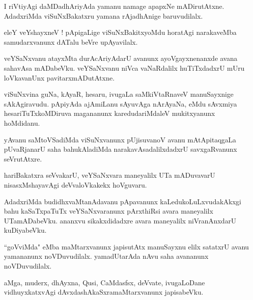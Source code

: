 \documentclass{article}
\begin{document}
\begin{mn}
I riVtiyAgi daMDadhAriyAda yamanu namage apapxNe mADirutAtxne. AdadxriMda viSuNxBakatxru yamana 
rAjadhAnige baruvudilalx.
\end{mn}

\begin{mn}
eleY veYshayxneV ! pApigaLige viSuNxBakitxyoMdu horatAgi narakaveMba samudarxvanunx dATalu beVre 
upAyavilalx.
\end{mn}

\begin{mn}
veYSaNxvanu atayxMta durAcAriyAdarU avanunx ayoVgayxnenanxde avana sahavAsa mADabeVku. 
veYSaNxvanu niVca vaNaRdalilx huTiTxdadxrU mUru loVkavanUnx pavitarxmADutAtxne.
\end{mn}

\begin{mn}
viSuNxvina guNa, kAyaR, hesaru, ivugaLa saMkiVtaRnaveV manuSayxnige sAkAgiravudu. pApiyAda 
ajAmiLanu sAyuvAga nArAyaNa, eMdu sAvxmiya hesariTuTxkoMDiruva magananunx karedudariMdaleV 
mukitxyanunx hoMdidanu.
\end{mn}

\begin{mn}
yAvanu saMtoVSadiMda viSuNxvanunx pUjisuvanoV avanu mAtApitaqgaLa pUvaRjanarU saha bahukAladiMda 
narakavAsadalilxdadxrU savxgaRvanunx seVrutAtxre.
\end{mn}

\begin{mn}
hariBakatxra seVvakarU, veYSaNxvara maneyalilx UTa mADuvavarU nisasxMshayavAgi deVvaloVkakekx 
hoVguvaru.
\end{mn}

\begin{mn}
AdadxriMda budidhxvaMtanAdavanu pApavanunx kaLedukoLuLxvudakAkxgi bahu kaSaTxpaTuTx 
veYSaNxvaranunx pArxthiRsi avara maneyalilx UTamADabeVku. ananxvu sikakxdidadxre avara maneyalilx 
niVranAnxdarU kuDiyabeVku.
\end{mn}

\begin{mn}
``goVviMda" eMba maMtarxvanunx japisutAtx manuSayxnu elilx satatxrU avanu yamananunx noVDuvudilalx.
yamadUtarAda nAvu saha avananunx noVDuvudilalx.
\end{mn}

\begin{mn}
aMga, muderx, dhAyxna, Qusi, CaMdasfsx, deVvate, ivugaLoDane vidhuyxkatxvAgi 
dAvxdashAkaSxramaMtarxvanunx japisabeVku.
\end{mn}
\end{document}
